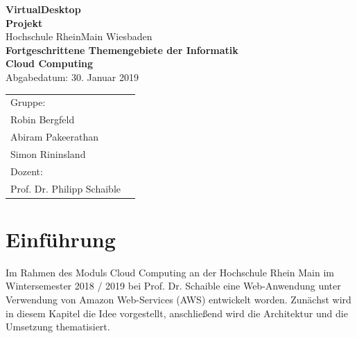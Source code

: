 \documentclass[a4paper, 12pt]{scrreprt}
\renewcommand\_{\textunderscore\allowbreak}
\begin{document}
\begin{titlepage}
    \begin{center}
    \LARGE \textbf{VirtualDesktop} \\
    \vspace{2.5cm}
    \large\textbf{Projekt}\\
    \vspace{2.5cm}
    \normalsize
    Hochschule RheinMain Wiesbaden \\
    \vspace{2cm}
    \large \textbf{Fortgeschrittene Themengebiete der Informatik\\ Cloud Computing\\}
    \vspace{1cm}
    \normalsize
    Abgabedatum: 30. Januar 2019\\
    \vspace{2.7cm}
    \end{center}
 \normalsize{
    \begin{tabular}{ll}
    	Gruppe: & \\
    	Robin Bergfeld & \\
    	Abiram Pakeerathan & \\
    	Simon Rininsland & \\[0.5cm]
    	Dozent: &\\
        Prof. Dr. Philipp Schaible & \\
    \end{tabular}
    }
\end{titlepage}



\clearpage
\tableofcontents
\clearpage



\chapter{Einführung}
Im Rahmen des Moduls Cloud Computing an der Hochschule Rhein Main im Wintersemester 2018 / 2019 bei Prof. Dr. Schaible eine Web-Anwendung unter Verwendung von Amazon Web-Services (AWS) entwickelt worden. Zunächst wird in diesem Kapitel die Idee vorgestellt, anschließend wird die Architektur und die Umsetzung thematisiert.
\end{document}
